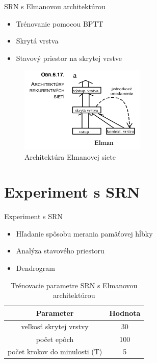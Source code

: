\documentclass[10pt]{beamer}
\begin{document}
\begin{frame}[fragile]{SRN s Elmanovou architektúrou}
  \begin{itemize}
    \item Trénovanie pomocou BPTT
    \item Skrytá vrstva 
    \item Stavový priestor na skrytej vrstve
  \end{itemize}

  \begin{figure}[H]
    \centering
    \includegraphics[width=6cm]{assets/elman_architecture}
    \caption{Architektúra Elmanovej siete}
  \end{figure}
\end{frame}

\section{Experiment s SRN}

\begin{frame}[fragile]{Experiment s SRN}
  \begin{itemize}
    \item Hľadanie spôsobu merania pamäťovej hĺbky
    \item Analýza stavového priestoru
    \item Dendrogram
  \end{itemize}

  \begin{table}[h!]
    \centering
    \begin{tabular}{|c|c|} 
    \hline
    Parameter & Hodnota \\ 
    \hline
    veľkosť skrytej vrstvy & 30  \\
    \hline
    počet epôch & 100  \\
    \hline
    počet krokov do minulosti (T) & 5 \\
    \hline
    \end{tabular}
    \caption{Trénovacie parametre SRN s Elmanovou architektúrou}
    \label{table:1}
\end{table}

\end{frame}
\end{document}
